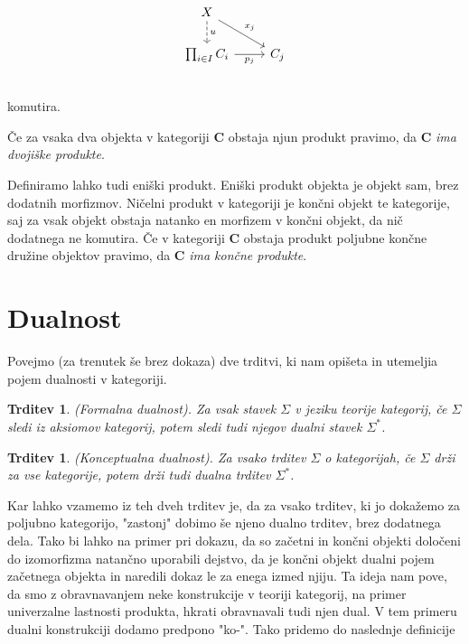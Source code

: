 \documentclass[12pt,a4paper]{book}
\theoremstyle{definition}
\theoremstyle{plain}
\newtheorem{trditev}[definicija]{Trditev}
\theoremstyle{definition}
\theoremstyle{remark}
\newcommand{\cat}[1]{\textbf{#1}}
\begin{document}
$$\begin{tikzcd}
X \ar[d, dashed, "u"] \ar[dr, "x_j"] & \\
\prod_{i \in I}C_i \ar[r, "p_j"'] & C_j \\
\end{tikzcd}$$
komutira.

Če za vsaka dva objekta v kategoriji $\cat{C}$ obstaja njun produkt pravimo, da $\cat{C}$ \emph{ima dvojiške produkte}.

Definiramo lahko tudi eniški produkt. Eniški produkt objekta je objekt sam, brez dodatnih morfizmov. Ničelni produkt v kategoriji je končni objekt te kategorije, saj za vsak objekt obstaja natanko en morfizem v končni objekt, da nič dodatnega ne komutira. Če v kategoriji $\cat{C}$ obstaja produkt poljubne končne družine objektov pravimo, da $\cat{C}$ \emph{ima končne produkte}.

\section{Dualnost}
Povejmo (za trenutek še brez dokaza) dve trditvi, ki nam opišeta in utemeljia pojem dualnosti v kategoriji.

\begin{trditev} \textit{(Formalna dualnost)}. 
Za vsak stavek $\Sigma$ v jeziku teorije kategorij, če $\Sigma$ sledi iz aksiomov kategorij, potem sledi tudi njegov dualni stavek $\Sigma^*$.
\end{trditev}

\begin{trditev} \textit{(Konceptualna dualnost)}.
Za vsako trditev $\Sigma$ o kategorijah, če $\Sigma$ drži za vse kategorije, potem drži tudi dualna trditev $\Sigma^*$.
\end{trditev}

Kar lahko vzamemo iz teh dveh trditev je, da za vsako trditev, ki jo dokažemo za poljubno kategorijo, "zastonj" dobimo še njeno dualno trditev, brez dodatnega dela. Tako bi lahko na primer pri dokazu, da so začetni in končni objekti določeni do izomorfizma natančno uporabili dejstvo, da je končni objekt dualni pojem začetnega objekta in naredili dokaz le za enega izmed njiju.
Ta ideja nam pove, da smo z obravnavanjem neke konstrukcije v teoriji kategorij, na primer univerzalne lastnosti produkta, hkrati obravnavali tudi njen dual. V tem primeru dualni konstrukciji dodamo predpono "ko-". Tako pridemo do naslednje definicije
\end{document}
